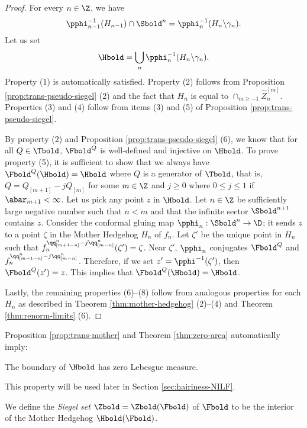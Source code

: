 \documentclass{amsart}
\begin{document}
\begin{proof}
    For every $n\in \Z$, we have 
    \[
        \pphi_{n-1}^{-1}(H_{n-1}) \cap \Sbold^n = \pphi_n^{-1}(H_n \backslash \gamma_n).
    \]
    Let us set 
    \[
    \Hbold = \bigcup_n \pphi_n^{-1}(H_n \backslash \gamma_n).
    \]
    Property (1) is automatically satisfied.
    Property (2) follows from Proposition \ref{prop:trans-pseudo-siegel} (2) and the fact that $H_n$ is equal to $\cap_{m \geq -1} \hat{Z}^{[m]}_n$.
    Properties (3) and (4) follow from items (3) and (5) of Proposition \ref{prop:trans-pseudo-siegel}.

    By property (2) and Proposition \ref{prop:trans-pseudo-siegel} (6), we know that for all $Q \in \Tbold$, $\Fbold^Q$ is well-defined and injective on $\Hbold$.
    To prove property (5), it is sufficient to show that we always have $\Fbold^Q(\Hbold) = \Hbold$ where $Q$ is a generator of $\Tbold$, that is, 
    $Q = Q_{[m+1]} - j Q_{[m]}$ for some $m \in \Z$ and $j \geq 0$ where $0 \leq j \leq 1$ if $\abar_{m+1} < \infty$.
    Let us pick any point $z$ in $\Hbold$.
    Let $n \in \Z$ be sufficiently large negative number such that $n < m$ and that the infinite sector $\Sbold^{n+1}$ contains $z$.
    Consider the conformal gluing map $\pphi_n : \Sbold^n \to \D$; it sends $z$ to a point $\zeta$ in the Mother Hedgehog $H_n$ of $f_n$.
    Let $\zeta'$ be the unique point in $H_n$ such that $f_n^{\qq^n_{[m+1-n]}-j\qq^n_{[m-n]}}(\zeta') = \zeta$.
    Near $\zeta'$, $\pphi_n$ conjugates $\Fbold^Q$ and $f_n^{\qq^n_{[m+1-n]}-j\qq^n_{[m-n]}}$.
    Therefore, if we set $z' = \pphi^{-1}(\zeta')$, then $\Fbold^Q(z') = z$.
    This implies that $\Fbold^Q(\Hbold) = \Hbold$.
    
    Lastly, the remaining properties (6)--(8) follow from analogous properties for each $H_n$ as described in Theorem \ref{thm:mother-hedgehog} (2)--(4) and Theorem \ref{thm:renorm-limits} (6).
\end{proof}

Proposition \ref{prop:trans-mother} and Theorem \ref{thm:zero-area} automatically imply:

\begin{proposition}
\label{prop:zero-area-trans}
    The boundary of $\Hbold$ has zero Lebesgue measure.
\end{proposition}

This property will be used later in Section \ref{sec:hairiness-NILF}.

\begin{definition}
    We define the \emph{Siegel set} $\Zbold = \Zbold(\Fbold)$ of $\Fbold$ to be the interior of the Mother Hedgehog $\Hbold(\Fbold)$. 
\end{definition}
\end{document}
